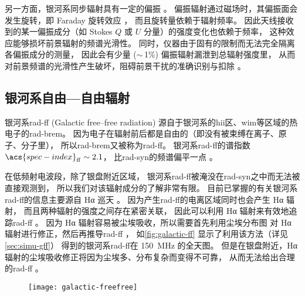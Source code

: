 另一方面，银河系同步辐射具有一定的偏振 \cite{bernardi2009,jelic2014,gehlot2018}。
偏振辐射通过磁场时，其偏振面会发生旋转，即 Faraday 旋转效应 \cite{rybicki1979}，
而且旋转量依赖于辐射频率。
因此天线接收到的某一偏振成分（如 Stokes $Q$ 或 $U$ 分量）的强度变化也依赖于频率，
这种效应能够损坏前景辐射的频谱光滑性。
同时，仪器由于固有的限制而无法完全隔离各偏振成分的测量，
因此会有少量 ($\sim$\,1\%) 偏振辐射漏泄到总辐射强度里，
从而对前景频谱的光滑性产生破坏，阻碍前景干扰的准确识别与扣除
\cite{jelic2010,alonso2014,nunhokee2017,gehlot2018,spinelli2018}。

\subsection{银河系自由—自由辐射}

银河系\acs{rad-ff} (Galactic free--free radiation)
源自于银河系的\ac{hii}区、\ac{wim}等区域的热电子的\ac{rad-brem}。
因为电子在辐射前后都是自由的（即没有被束缚在离子、原子、分子里），
所以\ac{rad-brem}又被称为\ac{rad-ff}。
银河系\ac{rad-ff}的谱指数 $\acs{spec-index}_{\R{ff}} \sim 2.1$，
比\ac{rad-syn}的频谱偏平一点 \cite{dickinson2003}。

在低频射电波段，除了银盘附近区域，
银河系\ac{rad-ff}被淹没在\ac{rad-syn}之中而无法被直接观测到，
所以我们对该辐射成分的了解非常有限。
目前已掌握的有关银河系\ac{rad-ff}的信息主要源自 Hα 巡天 \cite{finkbeiner2003}。
因为产生\ac{rad-ff}的电离区域同时也会产生 Hα 辐射，
而且两种辐射的强度之间存在紧密关联，
因此可以利用 Hα 辐射来有效地追踪\ac{rad-ff} \cite{smoot1998,dickinson2003}。
因为 Hα 辐射容易被尘埃吸收，所以需要首先利用尘埃分布图\cite{schlegel1998}
对 Hα 辐射进行修正，然后再推导\ac{rad-ff} \cite{dickinson2003}，
如\autoref{fig:galactic-ff} 显示了利用该方法（详见 \autoref{sec:simu-gff}）
得到的银河系\ac{rad-ff}在 \SI{150}{\MHz} 的全天图。
但是在银盘附近，Hα 辐射的尘埃吸收修正将因为尘埃多、分布复杂而变得不可靠，
从而无法给出合理的\ac{rad-ff} \cite{dickinson2003}。

\begin{figure}[htp]
  \centering
  \texttt{[image: galactic-freefree]}
  \label{fig:galactic-ff}
\end{figure}

